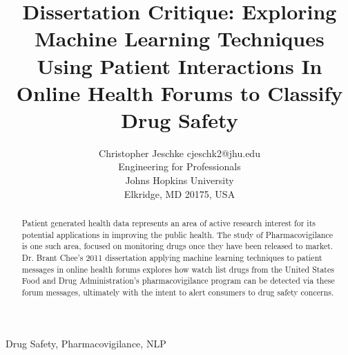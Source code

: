 \documentclass[twoside,11pt]{article}
\begin{document}
\title{Dissertation Critique: Exploring Machine Learning Techniques Using Patient
      Interactions In Online Health Forums to Classify Drug Safety}

\author{\name Christopher Jeschke \email cjeschk2@jhu.edu \\
       \addr Engineering for Professionals\\
       Johns Hopkins University\\
       Elkridge, MD 20175, USA}


\maketitle


\singlespacing

\begin{abstract}%
  Patient generated health data represents an area of active research interest
  for its potential applications in improving the public health. The study of
  Pharmacovigilance is one such area, focused on monitoring drugs once they have been released to market. Dr. Brant Chee's 2011 dissertation applying machine learning techniques to patient messages in online health forums explores how watch list drugs from the United States Food and Drug Administration's pharmacovigilance program can be detected via these forum messages, ultimately with the intent to alert consumers to drug safety concerns.
\end{abstract}

\begin{keywords}
  Drug Safety, Pharmacovigilance, NLP
\end{keywords}
\end{document}
